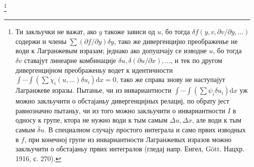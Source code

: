 ﻿\documentclass[11pt]{article}
\providecommand{\D}{\Delta}
\providecommand{\p}{\partial}
\providecommand{\dd}{\mathrm d}
\providecommand{\bd}{\bar{\delta}}
\begin{document}
\footnote{Ти закльучки не важат, ако \(y\) такоже зависи од \(u\), бо тогда \(\delta f(y,v,\p v/\p y,\ldots)\) содержи и члены \(\sum(\p f/\p y)\delta y\), тако же дивергенцијно преображенье не води к Лагранжевым изразам; једнако ако допушчају се изводне \(u\), бо тогда \(\delta v\) ставајут линеарне комбинације \(\delta u,\delta(\p u/\p x),\ldots\), и тек по другом дивергенцијном преображеньу водет к идентичности \(\int\!\cdots\!\int(\sum\chi_i(u,\ldots)\delta u_i)\dd x=0\), тако же справа знову не наступајут Лагранжеве изразы. Пытанье, чи из инвариантности \(\int\!\cdots\!\int(\sum\psi_i\delta u_i)\dd x\) уж можно закльучити о обстајаньу дивергенцијных релациј, по обрату јест равнозначно пытаньу, чи из того можно закльучити о инвариантности \(I\) в односу к групе, ктора не нужно води к тым самым \(\D u,\D x\), але води к тым самым \(\bd u\). В специалном случају простого интеграла и само првих изводных в \(f\), при конечној групе из инвариантности Лагранжевых изразов можно закльучити о обстајаньу првих интегралов (гледај напр. Енгел, Gött. Нацхр. 1916, с. 270).}
\end{document}
